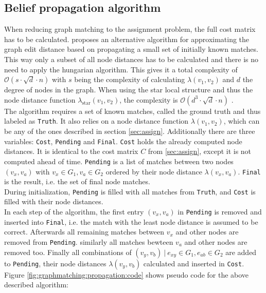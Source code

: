 \documentclass[
    12pt,                               %
    DIV=14,                     %
    parskip=half+,              %
    bigheadings,                %
    cleardoubleempty,   %
    halfparskip,                %
    ]{scrreprt} %
\begin{document}
\subsection{Belief propagation algorithm} \label{sec:beliefpropagation}
When reducing graph matching to the assignment problem, the full cost matrix has to be calculated. \cite{beliefpropagation} proposes an alternative algorithm for approximating the graph edit distance based on propagating a small set of initially known matches. This way only a subset of all node distances has to be calculated and there is no need to apply the hungarian algorithm. This gives it a total complexity of $\mathcal{O}(s \cdot \sqrt{d} \cdot n)$ with $s$ being the complexity of calculating $\lambda(v_1, v_2)$ and $d$ the degree of nodes in the graph. When using the star local structure and thus the node distance function $\lambda_{\text{star}}(v_1, v_2)$, the complexity is $\mathcal{O}(d^3 \cdot \sqrt{d} \cdot n)$ \cite{beliefpropagation}. \\
The algorithm requires a set of known matches, called the ground truth and thus labeled as \verb'Truth'. It also relies on a node distance function $\lambda(v_1, v_2)$, which can be any of the ones described in section \ref{sec:assign}. Additionally there are three variables: \verb'Cost', \verb'Pending' and \verb'Final'. \verb'Cost' holds the already computed node distances. It is identical to the cost matrix $C$ from \ref{sec:assign}, except it is not computed ahead of time. \verb'Pending' is a list of matches between two nodes $(v_x, v_a)$ with $v_x \in G_1, v_a \in G_2$ ordered by their node distance $\lambda(v_x, v_a)$. \verb'Final' is the result, i.e. the set of final node matches. \\
During initialization, \verb'Pending' is filled with all matches from \verb'Truth', and \verb'Cost' is filled with their node distances. \\
In each step of the algorithm, the first entry $(v_x, v_a)$ in \verb'Pending' is removed and inserted into \verb'Final', i.e. the match with the least node distance is assumed to be correct. Afterwards all remaining matches between $v_x$ and other nodes are removed from \verb'Pending'. similarly all matches bewteen $v_a$ and other nodes are removed too. Finally all combinations of $(v_y, v_b) \: | \: e_{xy} \in G_1, e_{ab} \in G_2$ are added to \verb'Pending', their node distances $\lambda(v_y, v_b)$ calculated and inserted in \verb'Cost'. \\
Figure \ref{fig:graphmatching:propagation:code} shows pseudo code for the above described algorithm:
\end{document}
